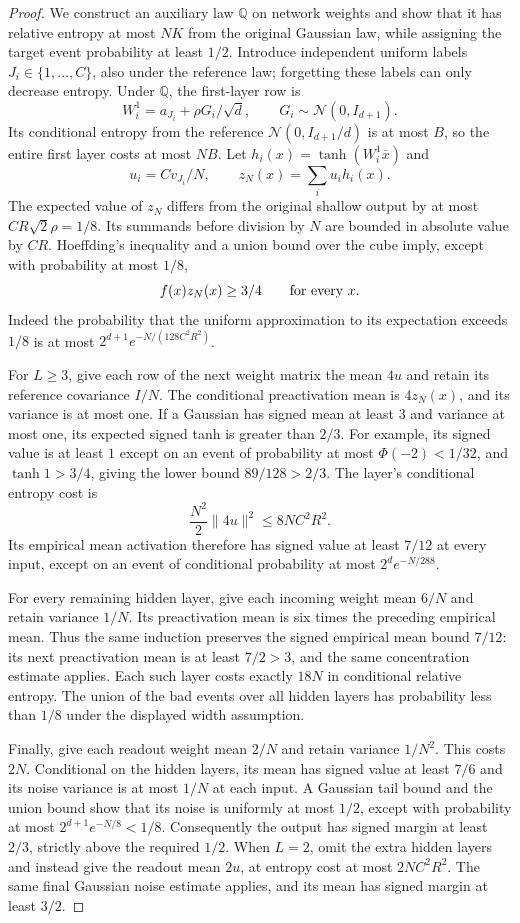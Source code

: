 \begin{proof}
We construct an auxiliary law $\mathbb Q$ on network weights and show
that it has relative entropy at most $NK$ from the original Gaussian
law, while assigning the target event probability at least $1/2$.
Introduce independent uniform labels $J_i\in\{1,\ldots,C\}$, also under
the reference law; forgetting these labels can only decrease entropy.
Under $\mathbb Q$, the first-layer row is
\[
 W_i^1=a_{J_i}+\rho G_i/\sqrt d,
 \qquad G_i\sim\mathcal N(0,I_{d+1}).
\]
Its conditional entropy from the reference $\mathcal N(0,I_{d+1}/d)$
is at most $B$, so the entire first layer costs at most $NB$.
Let $h_i(x)=\tanh(W_i^1\bar x)$ and
\[
 u_i=Cv_{J_i}/N,\qquad z_N(x)=\sum_i u_i h_i(x).
\]
The expected value of $z_N$ differs from the original shallow output
by at most $CR\sqrt2\rho=1/8$. Its summands before division by $N$
are bounded in absolute value by $CR$. Hoeffding's inequality and a
union bound over the cube imply, except with probability at most $1/8$,
\[
 f(x)z_N(x)\ge3/4\qquad\hbox{for every }x.
\]
Indeed the probability that the uniform approximation to its expectation
exceeds $1/8$ is at most $2^{d+1}e^{-N/(128C^2R^2)}$.

For $L\ge3$, give each row of the next weight matrix the mean $4u$
and retain its reference covariance $I/N$. The conditional preactivation
mean is $4z_N(x)$, and its variance is at most one.
If a Gaussian has signed mean at least $3$ and variance at most one,
its expected signed tanh is greater than $2/3$. For example, its signed
value is at least $1$ except on an event of probability at most
$\Phi(-2)<1/32$, and $\tanh1>3/4$, giving the lower bound $89/128>2/3$.
The layer's conditional entropy cost is
\[
 \frac{N^2}{2}\|4u\|^2\le8NC^2R^2.
\]
Its empirical mean activation therefore has signed value at least
$7/12$ at every input, except on an event of conditional probability
at most $2^d e^{-N/288}$.

For every remaining hidden layer, give each incoming weight mean $6/N$
and retain variance $1/N$. Its preactivation mean is six times the
preceding empirical mean. Thus the same induction preserves the signed
empirical mean bound $7/12$: its next preactivation mean is at least
$7/2>3$, and the same concentration estimate applies.
Each such layer costs exactly $18N$ in conditional relative entropy.
The union of the bad events over all hidden layers has probability
less than $1/8$ under the displayed width assumption.

Finally, give each readout weight mean $2/N$ and retain variance $1/N^2$.
This costs $2N$. Conditional on the hidden layers, its mean has signed
value at least $7/6$ and its noise variance is at most $1/N$ at each
input. A Gaussian tail bound and the union bound show that its noise
is uniformly at most $1/2$, except with probability at most
$2^{d+1}e^{-N/8}<1/8$. Consequently the output has signed margin at
least $2/3$, strictly above the required $1/2$.
When $L=2$, omit the extra hidden layers and instead give the readout
mean $2u$, at entropy cost at most $2NC^2R^2$. The same final Gaussian
noise estimate applies, and its mean has signed margin at least $3/2$.


\end{proof}
